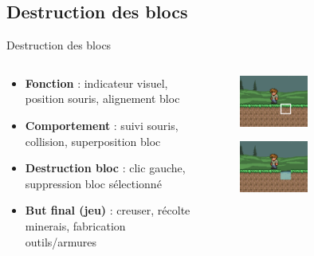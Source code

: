 \documentclass[aspectratio=169]{beamer}
\begin{document}
\subsection{Destruction des blocs}

\begin{frame}{Destruction des blocs}
    \begin{columns}
        \centering
        \begin{column}{0.5\textwidth}
            \centering
            
            \begin{itemize}
                \item \textbf{Fonction} : indicateur visuel, position souris, alignement bloc
                \item \textbf{Comportement} : suivi souris, collision, superposition bloc
                \item \textbf{Destruction bloc} : clic gauche, suppression bloc sélectionné
                \item \textbf{But final (jeu)} : creuser, récolte minerais, fabrication outils/armures
            \end{itemize}
        \end{column}
        \begin{column}{0.5\textwidth}
            \centering
            \begin{figure}
                \centering
                \captionsetup{format=sanslabel}
                \includegraphics[width=0.5\textwidth]{assets/destruction_1.png}
            \end{figure}
            \begin{figure}
                \centering
                \captionsetup{format=sanslabel}
                \includegraphics[width=0.5\textwidth]{assets/destruction_2.png}
            \end{figure}
        \end{column}
    \end{columns}
\end{frame}
\end{document}
